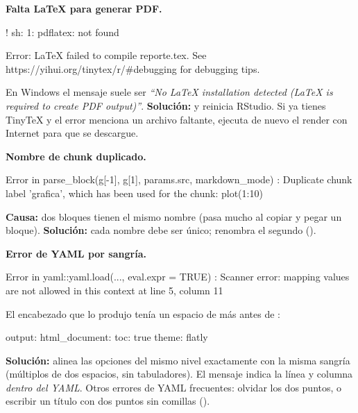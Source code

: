 \begin{advertencia}
\textbf{Falta LaTeX para generar PDF.}
\end{advertencia}

\begin{textocodigo}
! sh: 1: pdflatex: not found

Error: LaTeX failed to compile reporte.tex. See
https://yihui.org/tinytex/r/#debugging for debugging tips.
\end{textocodigo}

En Windows el mensaje suele ser \emph{``No LaTeX installation detected
(LaTeX is required to create PDF output)''}. \textbf{Solución:}
 y reinicia RStudio. Si ya tienes
TinyTeX y el error menciona un archivo  faltante, ejecuta de
nuevo el render con Internet para que se descargue.

\begin{advertencia}
\textbf{Nombre de chunk duplicado.}
\end{advertencia}

\begin{textocodigo}
Error in parse_block(g[-1], g[1], params.src, markdown_mode) :
  Duplicate chunk label 'grafica', which has been used for the chunk:
plot(1:10)
\end{textocodigo}

\textbf{Causa:} dos bloques tienen el mismo nombre (pasa mucho al copiar y
pegar un bloque). \textbf{Solución:} cada nombre debe ser único; renombra el
segundo ().

\begin{advertencia}
\textbf{Error de YAML por sangría.}
\end{advertencia}

\begin{textocodigo}
Error in yaml::yaml.load(..., eval.expr = TRUE) :
  Scanner error: mapping values are not allowed in this context at
  line 5, column 11
\end{textocodigo}

El encabezado que lo produjo tenía un espacio de más antes de
:

\begin{textocodigo}
output:
  html_document:
    toc: true
     theme: flatly
\end{textocodigo}

\textbf{Solución:} alinea las opciones del mismo nivel exactamente con la
misma sangría (múltiplos de dos espacios, sin tabuladores). El mensaje
indica la línea y columna \emph{dentro del YAML}. Otros errores de YAML
frecuentes: olvidar los dos puntos, o escribir un título con dos puntos sin
comillas ().

